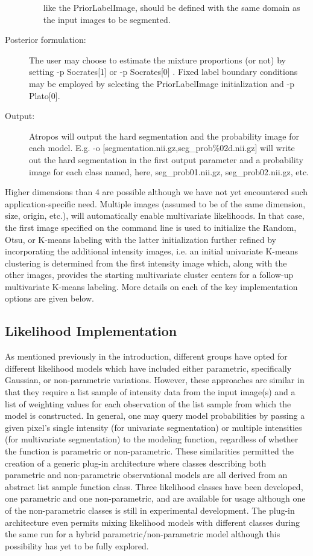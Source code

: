 \documentclass[11pt,english]{article}
\begin{document}
\begin{description}
\begin{itemize}
  like the {\ttfamily PriorLabelImage}, should be defined with the same domain as
  the input images to be segmented.  
\end{itemize}
\item[Posterior formulation:]  The user may choose to estimate the
  mixture proportions (or not) by setting  {\ttfamily -p Socrates[1]}
  or {\ttfamily -p Socrates[0] }.  Fixed label boundary conditions may be employed by
  selecting the {\ttfamily PriorLabelImage} initialization and   {\ttfamily -p Plato[0]}.
\item[Output:] Atropos will output the hard segmentation and the
  probability image for each model.  E.g.  {\ttfamily -o
    [segmentation.nii.gz,seg\_prob\%02d.nii.gz]} will write
  out the hard segmentation in the first output parameter and a
  probability image for each class named, here, seg\_prob01.nii.gz,
  seg\_prob02.nii.gz, etc. 
\end{description}
Higher dimensions than 4 are possible although we have not yet encountered such 
application-specific need.  Multiple images (assumed to be of the same
dimension, size, origin, etc.), will automatically enable multivariate
likelihoods.  In that case, the first image specified on the 
command line is used to initialize the Random, Otsu, or K-means labeling with the latter initialization further
refined by incorporating the additional intensity images, i.e. an initial univariate K-means clustering is determined 
from the first intensity image which, along with the other images, provides the starting multivariate cluster centers for a 
follow-up multivariate K-means labeling.    More details on each of
the key implementation options are given below.  

\subsection{Likelihood Implementation}
As mentioned previously in the introduction, different groups have
opted for different likelihood models which have included either
parametric, specifically Gaussian, or non-parametric variations.
However, these approaches are similar in that they require a list
sample of intensity data from the input image(s) and a list of
weighting values for each observation of the list sample from which
the model is constructed.  In general, one may query model
probabilities by passing a given pixel's single intensity (for
univariate segmentation) or multiple intensities (for multivariate
segmentation) to the modeling function, regardless of whether the
function is parametric or non-parametric.  These similarities permitted
the creation of a generic plug-in architecture where classes
describing both parametric and non-parametric observational models are
all derived from an abstract list sample function class.  Three
likelihood classes have been developed, one parametric and one
non-parametric, and are available for usage although one of the
non-parametric classes is still in experimental development.  The
plug-in architecture even permits mixing likelihood models with
different classes during the same run for a hybrid
parametric/non-parametric model although this possibility has yet
to be fully explored.
\end{document}
